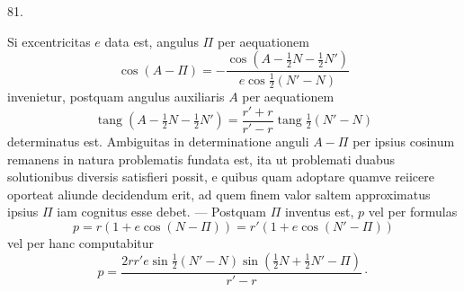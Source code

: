 \par{}\medskip
\hypertarget{native-110-article081}{}
\begin{center}81.\end{center}
Si excentricitas $e$ data est, angulus $\Pi$ per aequationem
\[
\cos(A-\Pi)=-\frac{\cos(A-\tfrac12N-\tfrac12N')}{e\cos\tfrac12(N'-N)}
\]
invenietur, postquam angulus auxiliaris $A$ per aequationem
\[
\operatorname{tang}(A-\tfrac12N-\tfrac12N')=\frac{r'+r}{r'-r}\operatorname{tang}\tfrac12(N'-N)
\]
determinatus est. Ambiguitas in determinatione anguli $A-\Pi$ per ipsius cosinum remanens in natura problematis fundata est, ita ut problemati duabus solutionibus diversis satisfieri possit, e quibus quam adoptare quamve reiicere oporteat aliunde decidendum erit, ad quem finem valor saltem approximatus ipsius $\Pi$ iam cognitus esse debet. — Postquam $\Pi$ inventus est, $p$ vel per formulas
\[
p=r(1+e\cos(N-\Pi))=r'(1+e\cos(N'-\Pi))
\]
vel per hanc computabitur
\[
p=\frac{2rr'e\sin\tfrac12(N'-N)\sin(\tfrac12N+\tfrac12N'-\Pi)}{r'-r}\mathpunct{\cdot}
\]
